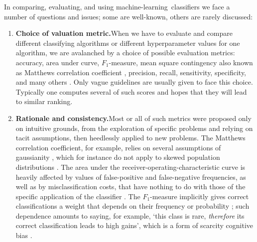\documentclass[\ifafour a4paper,12pt,\else a5paper,10pt,\fi%
onecolumn,oneside,article,%
british%
]{memoir}
\theoremstyle{remark}
\theoremstyle{innote}
\renewcommand*{\|}[1][]{\nonscript\:#1\vert\nonscript\:\mathopen{}}
\newcommand*{\sect}{\S}%
\newcommand*{\ml}{machine-learning}
\begin{document}
\bigskip

In comparing, evaluating, and using \ml\ classifiers we face a number of questions and issues; some are well-known, others are rarely discussed:

\begin{enumerate}[label=\textbf{\textsf{i\arabic*}},ref=\textbf{\textsf{i\arabic*}},itemsep=\parsep]
  
\item\label{item:metrics}\textsf{\textbf{Choice of valuation metric.}}\enspace When we have to evaluate and compare different classifying algorithms or different hyperparameter values for one algorithm, we are avalanched by a choice of possible evaluation metrics: accuracy, area under curve, $F_{1}$-measure, mean square contingency \autocites[denoted \enquote{$r$} there]{yule1912} also known as Matthews correlation coefficient \autocites{matthews1975}[\sect~31 p.~183]{fisher1925_r1963}, precision, recall, sensitivity, specificity, and many others \autocites{sammutetal2011_r2017}[see also the analysis in ][]{goodmanetal1954,goodmanetal1959,goodmanetal1963,goodmanetal1972b}. Only vague guidelines are usually given to face this choice. Typically one computes several of such scores and hopes that they will lead to similar ranking.

\item\label{item:rationale}\textsf{\textbf{Rationale and consistency.}}\enspace Most or all of such metrics were proposed only on intuitive grounds, from the exploration of specific problems and relying on tacit assumptions, then heedlessly applied to new problems. The Matthews correlation coefficient, for example, relies on several assumptions of gaussianity \autocites[\sect~31 p.~183 first paragraph]{fisher1925_r1963}, which for instance do not apply to skewed population distributions \autocites{jenietal2013,zhu2020}. The area under the receiver-operating-characteristic curve is heavily affected by values of false-positive and false-negative frequencies, as well as by misclassification costs, that have nothing to do with those of the specific application of the classifier \autocites{bakeretal2001,loboetal2008}. The $F_{1}$-measure implicitly gives correct classifications a weight that depends on their frequency or probability \autocites{handetal2018}; such dependence amounts to saying, for example, \enquote*{this class is rare, \emph{therefore} its correct classification leads to high gains}, which is a form of scarcity cognitive bias \autocites{camereretal1989,kimetal1999,mittoneetal2009}.


\end{enumerate}
\end{document}
